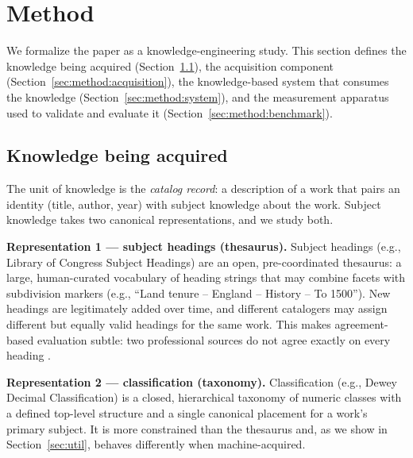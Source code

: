 
\section{Method}
\label{sec:method}

We formalize the paper as a knowledge-engineering study. This section
defines the knowledge being acquired (Section~\ref{sec:method:knowledge}),
the acquisition component (Section~\ref{sec:method:acquisition}), the
knowledge-based system that consumes the knowledge
(Section~\ref{sec:method:system}), and the measurement apparatus used to
validate and evaluate it (Section~\ref{sec:method:benchmark}).

\subsection{Knowledge being acquired}
\label{sec:method:knowledge}

The unit of knowledge is the \emph{catalog record}: a description of a work
that pairs an identity (title, author, year) with subject knowledge about
the work. Subject knowledge takes two canonical representations, and we
study both.

\textbf{Representation 1 --- subject headings (thesaurus).} Subject headings
(e.g., Library of Congress Subject Headings) are an open, pre-coordinated
thesaurus: a large, human-curated vocabulary of heading strings that may
combine facets with subdivision markers (e.g., ``Land tenure -- England --
History -- To 1500''). New headings are legitimately added over time, and
different catalogers may assign different but equally valid headings for the
same work. This makes agreement-based evaluation subtle: two professional
sources do not agree exactly on every heading
.

\textbf{Representation 2 --- classification (taxonomy).} Classification
(e.g., Dewey Decimal Classification) is a closed, hierarchical taxonomy of
numeric classes with a defined top-level structure and a single canonical
placement for a work's primary subject. It is more constrained than the
thesaurus and, as we show in Section~\ref{sec:util}, behaves differently
when machine-acquired.

